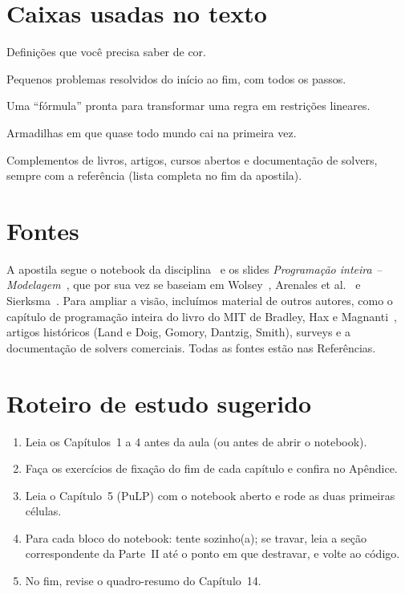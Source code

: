 \section*{Caixas usadas no texto}

\begin{definicao}
Definições que você precisa saber de cor.
\end{definicao}
\begin{exemplo}
Pequenos problemas resolvidos do início ao fim, com todos os passos.
\end{exemplo}
\begin{receita}
Uma ``fórmula'' pronta para transformar uma regra em restrições lineares.
\end{receita}
\begin{atencao}
Armadilhas em que quase todo mundo cai na primeira vez.
\end{atencao}
\begin{outros}
Complementos de livros, artigos, cursos abertos e documentação de solvers, sempre com a referência
(lista completa no fim da apostila).
\end{outros}

\section*{Fontes}

A apostila segue o notebook da disciplina~\cite{notebook} e os slides \emph{Programação inteira --
Modelagem}~\cite{slides}, que por sua vez se baseiam em Wolsey~\cite{wolsey1998}, Arenales et
al.~\cite{arenales2007} e Sierksma~\cite{sierksma1996}. Para ampliar a visão, incluímos material de outros autores,
como o capítulo de programação inteira do livro do MIT de Bradley, Hax e Magnanti~\cite{amp}, artigos históricos
(Land e Doig, Gomory, Dantzig, Smith), surveys e a documentação de solvers comerciais. Todas as fontes estão nas
Referências.

\section*{Roteiro de estudo sugerido}

\begin{enumerate}
  \item Leia os Capítulos~1 a 4 antes da aula (ou antes de abrir o notebook).
  \item Faça os exercícios de fixação do fim de cada capítulo e confira no Apêndice.
  \item Leia o Capítulo~5 (PuLP) com o notebook aberto e rode as duas primeiras células.
  \item Para cada bloco do notebook: tente sozinho(a); se travar, leia a seção correspondente da Parte~II até o ponto em
  que destravar, e volte ao código.
  \item No fim, revise o quadro-resumo do Capítulo~14.
\end{enumerate}
